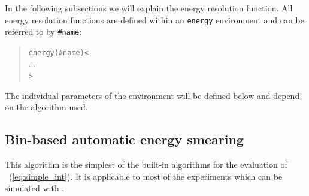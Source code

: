 In the following subsections we will explain the energy resolution function.
All energy resolution functions are defined within an {\tt energy} environment and can be referred to by {\tt \#name}:
\begin{quote}
  {\tt energy(\#name)<\\
\tb $\ldots$\\
>}
\end{quote}
The individual parameters of the environment will be defined below and depend on the algorithm used.

\subsection{Bin-based automatic energy smearing}

This algorithm is the simplest of the built-in algorithms for the evaluation
of \eq~(\ref{eq:simple_int}). It is applicable to most of the
experiments which can be simulated with \GLOBES .

